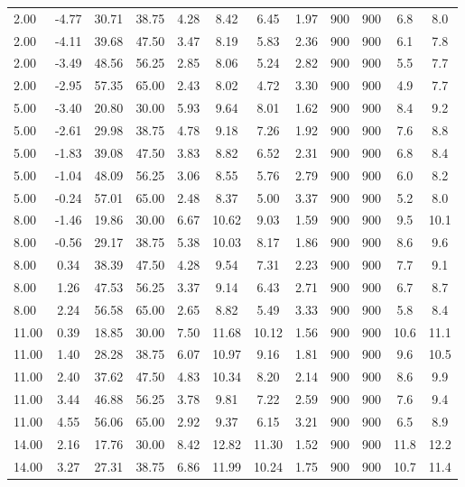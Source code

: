 \documentclass[english]{SPFShortReport}
\begin{document}
\begin{table}[!ht]
\begin{small}
\begin{center}
{\begin{tabular}{l | c c c c c c c c c c c }
2.00 & -4.77 & 30.71 & 38.75 & 4.28 & 8.42 & 6.45 & 1.97 & 900 & 900 & 6.8 & 8.0\\ 
2.00 & -4.11 & 39.68 & 47.50 & 3.47 & 8.19 & 5.83 & 2.36 & 900 & 900 & 6.1 & 7.8\\ 
2.00 & -3.49 & 48.56 & 56.25 & 2.85 & 8.06 & 5.24 & 2.82 & 900 & 900 & 5.5 & 7.7\\ 
2.00 & -2.95 & 57.35 & 65.00 & 2.43 & 8.02 & 4.72 & 3.30 & 900 & 900 & 4.9 & 7.7\\ 
5.00 & -3.40 & 20.80 & 30.00 & 5.93 & 9.64 & 8.01 & 1.62 & 900 & 900 & 8.4 & 9.2\\ 
5.00 & -2.61 & 29.98 & 38.75 & 4.78 & 9.18 & 7.26 & 1.92 & 900 & 900 & 7.6 & 8.8\\ 
5.00 & -1.83 & 39.08 & 47.50 & 3.83 & 8.82 & 6.52 & 2.31 & 900 & 900 & 6.8 & 8.4\\ 
5.00 & -1.04 & 48.09 & 56.25 & 3.06 & 8.55 & 5.76 & 2.79 & 900 & 900 & 6.0 & 8.2\\ 
5.00 & -0.24 & 57.01 & 65.00 & 2.48 & 8.37 & 5.00 & 3.37 & 900 & 900 & 5.2 & 8.0\\ 
8.00 & -1.46 & 19.86 & 30.00 & 6.67 & 10.62 & 9.03 & 1.59 & 900 & 900 & 9.5 & 10.1\\ 
8.00 & -0.56 & 29.17 & 38.75 & 5.38 & 10.03 & 8.17 & 1.86 & 900 & 900 & 8.6 & 9.6\\ 
8.00 & 0.34 & 38.39 & 47.50 & 4.28 & 9.54 & 7.31 & 2.23 & 900 & 900 & 7.7 & 9.1\\ 
8.00 & 1.26 & 47.53 & 56.25 & 3.37 & 9.14 & 6.43 & 2.71 & 900 & 900 & 6.7 & 8.7\\ 
8.00 & 2.24 & 56.58 & 65.00 & 2.65 & 8.82 & 5.49 & 3.33 & 900 & 900 & 5.8 & 8.4\\ 
11.00 & 0.39 & 18.85 & 30.00 & 7.50 & 11.68 & 10.12 & 1.56 & 900 & 900 & 10.6 & 11.1\\ 
11.00 & 1.40 & 28.28 & 38.75 & 6.07 & 10.97 & 9.16 & 1.81 & 900 & 900 & 9.6 & 10.5\\ 
11.00 & 2.40 & 37.62 & 47.50 & 4.83 & 10.34 & 8.20 & 2.14 & 900 & 900 & 8.6 & 9.9\\ 
11.00 & 3.44 & 46.88 & 56.25 & 3.78 & 9.81 & 7.22 & 2.59 & 900 & 900 & 7.6 & 9.4\\ 
11.00 & 4.55 & 56.06 & 65.00 & 2.92 & 9.37 & 6.15 & 3.21 & 900 & 900 & 6.5 & 8.9\\ 
14.00 & 2.16 & 17.76 & 30.00 & 8.42 & 12.82 & 11.30 & 1.52 & 900 & 900 & 11.8 & 12.2\\ 
14.00 & 3.27 & 27.31 & 38.75 & 6.86 & 11.99 & 10.24 & 1.75 & 900 & 900 & 10.7 & 11.4\\ 

\end{tabular}}
\end{center}
\end{small}
\end{table}
\end{document}
